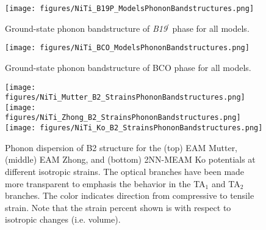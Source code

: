 \documentclass[preprint,colorlinks=true,linkcolor=black,citecolor=black]{elsarticle}
\begin{document}
\begin{figure}[!htp]
    \begin{centering}
        \texttt{[image: figures/NiTi\_B19P\_ModelsPhononBandstructures.png]}
        \caption{
          Ground-state phonon bandstructure of \textit{B19}$^\prime$ phase for all models.
        }
        \label{fig:allmodels_B19P}
    \end{centering}
\end{figure}


\begin{figure}[!htp]
    \begin{centering}
        \texttt{[image: figures/NiTi\_BCO\_ModelsPhononBandstructures.png]}
        \caption{
          Ground-state phonon bandstructure of BCO phase for all models.
        }
        \label{fig:allmodels_B19P}
    \end{centering}
\end{figure}

\begin{figure}[!htp]
    \begin{centering}
        \texttt{[image: figures/NiTi\_Mutter\_B2\_StrainsPhononBandstructures.png]}
        \vspace{1mm}
        \texttt{[image: figures/NiTi\_Zhong\_B2\_StrainsPhononBandstructures.png]}
        \vspace{1mm}
        \texttt{[image: figures/NiTi\_Ko\_B2\_StrainsPhononBandstructures.png]}
        \caption{
           Phonon dispersion of B2 structure for the  (top) EAM Mutter, (middle) EAM Zhong, and (bottom) 2NN-MEAM Ko potentials at different isotropic strains. The optical branches have been made more transparent to emphasis the behavior in the TA$_1$ and TA$_2$ branches. The color indicates direction from compressive to tensile strain. Note that the strain percent shown is with respect to isotropic changes (i.e. volume). 
        }
        \label{fig:mutter_zhong_phonon_b2}
    \end{centering}
\end{figure}


\end{document}
